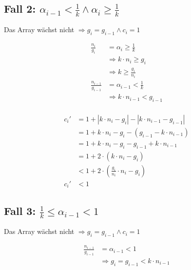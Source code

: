 \documentclass[parskip=half,a4paper]{scrartcl}
\begin{document}
\subsection*{Fall 2: $\alpha_{i-1} < \frac{1}{k} \land \alpha_i \ge \frac{1}{k}$}

Das Array wächst nicht
$\Rightarrow g_i = g_{i-1} \land c_i = 1$

\begin{equation}
\begin{aligned}
\frac{n_i}{g_i} &= \alpha_i \ge \frac{1}{k} \\
& \Rightarrow k \cdot n_i \ge g_i\\
& \Rightarrow k \ge \frac{g_i}{n_i}\\
\frac{n_{i-1}}{g_{i-1}} &= \alpha_{i-1} < \frac{1}{k} \\
& \Rightarrow k \cdot n_{i-1} < g_{i-1}\\
\end{aligned}
\end{equation}

\begin{equation}
\begin{aligned}
   c_i' &= 1 + \left|k \cdot n_i - g_i\right| - \left|k \cdot n_{i-1} - g_{i-1}\right|\\
   &= 1 + k \cdot n_i - g_i - \left(g_{i-1} - k \cdot n_{i-1}\right)\\
   &= 1 + k \cdot n_i - g_i - g_{i-1} + k \cdot n_{i-1}\\
   &= 1 + 2 \cdot \left(k\cdot n_i - g_i\right)\\
   &< 1 + 2 \cdot \left(\frac{g_i}{n_i} \cdot n_i - g_i\right)\\
   c_i' &< 1
\end{aligned}
\end{equation}


\subsection*{Fall 3: $\frac{1}{k} \le \alpha_{i-1} < 1$}

Das Array wächst nicht
$\Rightarrow g_i = g_{i-1} \land c_i = 1$

\begin{equation}
\begin{aligned}
\frac{n_{i-1}}{g_{i-1}} &= \alpha_{i-1} < 1 \\
& \Rightarrow g_i = g_{i-1} < k\cdot n_{i-1}\\
\end{aligned}
\end{equation}
\end{document}
